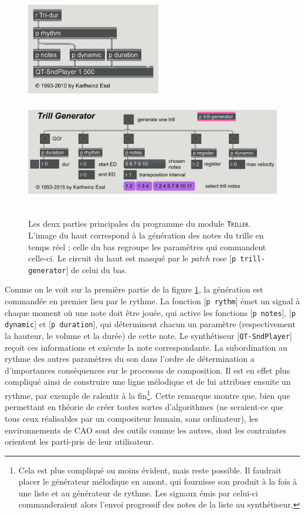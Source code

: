 \documentclass[a4paper,12pt]{article}
\newcommand{\module}[1]{\texttt{\textsc{#1}}}
\newcommand{\patch}[1]{[\texttt{#1}]}
\begin{document}
\begin{figure}[h!]
\begin{center}
\includegraphics[height=4cm]{images/triller2.jpg} \\ \bigskip 
\includegraphics[height=5cm]{images/triller1.jpg}
\label{trillermain}
\caption{\footnotesize Les deux parties principales du programme du module \module{Triller}. L'image du haut correspond à la génération des notes du trille en temps réel ; celle du bas regroupe les paramètres qui commandent celle-ci. Le circuit du haut est masqué par le \emph{patch} rose \patch{p trill-generator} de celui du bas.}
\end{center}
\end{figure}

Comme on le voit sur la première partie de la figure \ref{trillermain}, la génération est commandée en premier lieu par le rythme. La fonction \patch{p rythm} émet un signal à chaque moment où une note doit être jouée, qui active les fonctions \patch{p notes}, \patch{p dynamic} et \patch{p duration}, qui déterminent chacun un paramètre (respectivement la hauteur, le volume et la durée) de cette note. 	Le synthétiseur \patch{QT-SndPlayer} reçoit ces informations et exécute la note correspondante. La subordination au rythme des autres paramètres du son dans l'ordre de détermination a d'importances conséquences sur le processus de composition. Il est en effet plus compliqué ainsi de construire une ligne mélodique et de lui attribuer ensuite un rythme, par exemple de ralentir à la fin\footnote{Cela est plus compliqué ou moins évident, mais reste possible. Il faudrait placer le générateur mélodique en amont, qui fournisse son produit à la fois à une liste et au générateur de rythme. Les signaux émis par celui-ci commanderaient alors l'envoi progressif des notes de la liste au synthétiseur.}. Cette remarque montre que, bien que permettant en théorie de créer toutes sortes d'algorithmes (ne seraient-ce que tous ceux réalisables par un compositeur humain, sans ordinateur), les environnements de CAO sont des outils comme les autres, dont les contraintes orientent les parti-pris de leur utilisateur.
\end{document}
